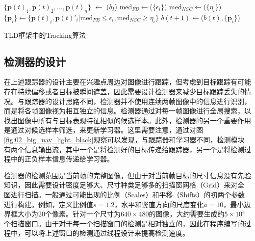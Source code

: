 \begin{algorithm2e}[ht]
	\SetAlgoLined
	\BlankLine
	$\{\mathbf{p}(t)_1, \mathbf{p}(t)_2,...,\mathbf{p}(t)_n\}$ $\leftarrow$ \Initialization($b_I$)\;	
	$\text{med}_{FB} \leftarrow$\MedianFlow($\{\epsilon_i\}$) \;
	$\text{med}_{NCC} \leftarrow$\MedianFlow($\{\eta_i\}$) \;
	$\{\bar{\mathbf{p}}_i\} \leftarrow  \{\mathbf{p}(t)_i,\mathbf{p}(t)'_i|\text{med}_{FB} \le \epsilon_i, \text{med}_{NCC} \ge \eta_i \}$\;
	$b(t+1) \leftarrow$\Transform($b(t),\{\bar{\mathbf{p}}_i\}$)\;
	\caption{TLD框架中的Tracking算法}
	\label{alg:tld_tracking}
\end{algorithm2e}



\subsection{检测器的设计}
在上述跟踪器的设计主要在兴趣点周边对图像进行跟踪，但考虑到目标跟踪有可能存在持续偏移或者目标被瞬间遮盖，因此需要设计检测器来减少目标跟踪丢失的情况。与跟踪器的设计思路不同，检测器并不使用连续两帧图像中的信息进行识别，而是将各帧图像视为相互独立的信息。检测器通过对每一帧图像进行全局搜索，以找出图像中所有与目标表观特征相似的候选样本。此外，检测器的另一个重要作用是通过对候选样本筛选，来更新学习器。这里需要注意，通过对图\ref{fig:02_big_uav_light_black}观察可以发现，与跟踪器和学习器不同，检测模块有两个信息输出流，其中一个是将检测好的目标传递给跟踪器，另一个是将检测过程中的正负样本信息传递给学习器。

检测器的检测范围是当前帧的完整图像，但由于对当前帧目标的尺寸信息没有先验知识，因此需要设计密度足够大、尺寸种类足够多的扫描窗网格（Grid）来对全图进行扫描。一般通过可能出现的比例（Scales）和平移（Shifts）的初两个参数进行构建。例如，定义比例值$s=1.2$，水平和竖直方向的尺度变化$a=10$，最小边界框大小为20个像素。针对一个尺寸为$640\times480$的图像，大约需要生成约$5\times10^4$个扫描窗口。由于对于每一个扫描窗口的检测是相对独立的，因此在程序编写的过程中，可以将上述窗口的检测通过线程设计来提高检测速度。

